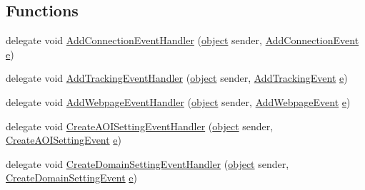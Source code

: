 \subsection*{Functions}
\begin{DoxyCompactItemize}
\item 
delegate void \hyperlink{namespace_web_analyzer_1_1_events_a902fba3fe7d4503704b73171cd38cf68}{Add\+Connection\+Event\+Handler} (\hyperlink{_u_i_2_h_t_m_l_resources_2js_2lib_2underscore_8min_8js_aae18b7515bb2bc4137586506e7c0c903}{object} sender, \hyperlink{class_web_analyzer_1_1_events_1_1_add_connection_event}{Add\+Connection\+Event} \hyperlink{_u_i_2_h_t_m_l_resources_2js_2lib_2bootstrap_8min_8js_ab5902775854a8b8440bcd25e0fe1c120}{e})
\item 
delegate void \hyperlink{namespace_web_analyzer_1_1_events_af9a78356c120c2e762b646299c47ece7}{Add\+Tracking\+Event\+Handler} (\hyperlink{_u_i_2_h_t_m_l_resources_2js_2lib_2underscore_8min_8js_aae18b7515bb2bc4137586506e7c0c903}{object} sender, \hyperlink{class_web_analyzer_1_1_events_1_1_add_tracking_event}{Add\+Tracking\+Event} \hyperlink{_u_i_2_h_t_m_l_resources_2js_2lib_2bootstrap_8min_8js_ab5902775854a8b8440bcd25e0fe1c120}{e})
\item 
delegate void \hyperlink{namespace_web_analyzer_1_1_events_a14e9ad6e502bcecfc5fa91d8b1fd2d1a}{Add\+Webpage\+Event\+Handler} (\hyperlink{_u_i_2_h_t_m_l_resources_2js_2lib_2underscore_8min_8js_aae18b7515bb2bc4137586506e7c0c903}{object} sender, \hyperlink{class_web_analyzer_1_1_events_1_1_add_webpage_event}{Add\+Webpage\+Event} \hyperlink{_u_i_2_h_t_m_l_resources_2js_2lib_2bootstrap_8min_8js_ab5902775854a8b8440bcd25e0fe1c120}{e})
\item 
delegate void \hyperlink{namespace_web_analyzer_1_1_events_a1da12d77ad447a64e9f63c4ce04040ff}{Create\+A\+O\+I\+Setting\+Event\+Handler} (\hyperlink{_u_i_2_h_t_m_l_resources_2js_2lib_2underscore_8min_8js_aae18b7515bb2bc4137586506e7c0c903}{object} sender, \hyperlink{class_web_analyzer_1_1_events_1_1_create_a_o_i_setting_event}{Create\+A\+O\+I\+Setting\+Event} \hyperlink{_u_i_2_h_t_m_l_resources_2js_2lib_2bootstrap_8min_8js_ab5902775854a8b8440bcd25e0fe1c120}{e})
\item 
delegate void \hyperlink{namespace_web_analyzer_1_1_events_a51e3882127acccb363a75b247db1d884}{Create\+Domain\+Setting\+Event\+Handler} (\hyperlink{_u_i_2_h_t_m_l_resources_2js_2lib_2underscore_8min_8js_aae18b7515bb2bc4137586506e7c0c903}{object} sender, \hyperlink{class_web_analyzer_1_1_events_1_1_create_domain_setting_event}{Create\+Domain\+Setting\+Event} \hyperlink{_u_i_2_h_t_m_l_resources_2js_2lib_2bootstrap_8min_8js_ab5902775854a8b8440bcd25e0fe1c120}{e})

\end{DoxyCompactItemize}
